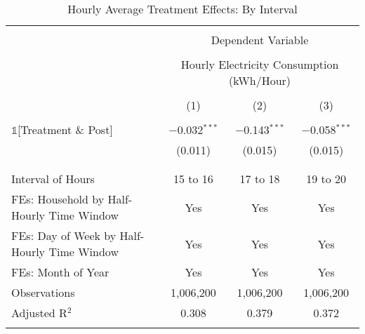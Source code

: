 
\begin{table}[!htbp] \centering 
  \caption{Hourly Average Treatment Effects: By Interval} 
  \label{Table:Hourly-ATEs_For-Different-Intervals} 
\small 
\begin{tabular}{@{\extracolsep{0pt}}lccc} 
\\[-1.8ex]\hline 
\hline \\[-1.8ex] 
 & \multicolumn{3}{c}{Dependent Variable} \\ 
\cline{2-4} 
\\[-1.8ex] & \multicolumn{3}{c}{Hourly Electricity Consumption  (kWh/Hour)} \\ 
\\[-1.8ex] & (1) & (2) & (3)\\ 
\hline \\[-1.8ex] 
 $\mathbb{1}$[Treatment \& Post] & $-$0.032$^{***}$ & $-$0.143$^{***}$ & $-$0.058$^{***}$ \\ 
  & (0.011) & (0.015) & (0.015) \\ 
  & & & \\ 
\hline \\[-1.8ex] 
Interval of Hours & 15 to 16 & 17 to 18 & 19 to 20 \\ 
FEs: Household by Half-Hourly Time Window & Yes & Yes & Yes \\ 
FEs: Day of Week by Half-Hourly Time Window & Yes & Yes & Yes \\ 
FEs: Month of Year & Yes & Yes & Yes \\ 
Observations & 1,006,200 & 1,006,200 & 1,006,200 \\ 
Adjusted R$^{2}$ & 0.308 & 0.379 & 0.372 \\ 
\hline 
\hline \\[-1.8ex] 
\end{tabular} 
\end{table} 
